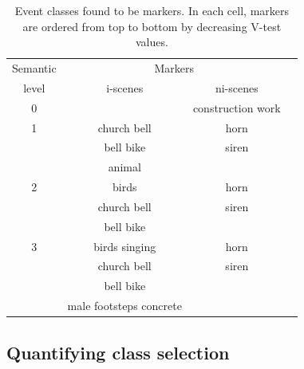 \documentclass[twoside,twocolumn]{article}
\begin{document}
\begin{table}[t]
 \setlength{\tabcolsep}{0.1pt}
 \centering
  {\renewcommand{\arraystretch}{0.9}
\begin{tabular}{c c c c} 
Semantic   &  \multicolumn{2}{c}{Markers} \\
level & i-scenes & ni-scenes \\
\hline
0  &              &  construction work  \\
\hline
1  & church bell  & horn  \\
   & bell bike    & siren \\
   & animal       &       \\
   \hline
2  & birds         & horn  \\
   & church bell   & siren \\
   & bell bike     &       \\
   \hline
3  & birds singing & horn  \\
   & church bell   & siren \\
   & bell bike     &       \\
   & male footsteps concrete &  \\
  \hline
\end{tabular}
}
\vspace{0.5mm}
\caption{\label{tab:markers} Event classes found to be markers. In each cell, markers are ordered from top to bottom by decreasing V-test values.}
\end{table}

\subsection{Quantifying class selection}
\label{sec:QuantifyingClassSelection}
\end{document}
